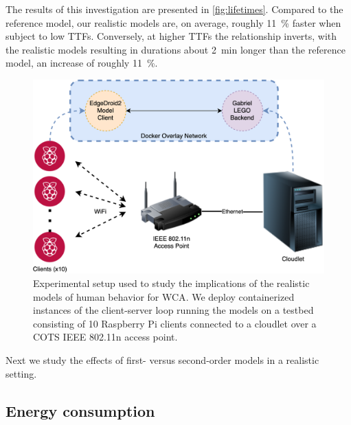 The results of this investigation are presented in \cref{fig:lifetimes}.
Compared to the reference model, our realistic models are, on average, roughly \SI{11}{\percent} faster when subject to low \acp{TTF}.
Conversely, at higher \acp{TTF} the relationship inverts, with the realistic models resulting in durations about \SI{2}{\minute} longer than the reference model, an increase of roughly \SI{11}{\percent}.


\begin{figure}
    \centering
    \includegraphics[width=\columnwidth]{figs/EdgeDroid2ExperimentalSetup.png}
    \caption{%
        Experimental setup used to study the implications of the realistic models of human behavior for \ac{WCA}.
        We deploy containerized instances of the client-server loop running the models on a testbed consisting of \num{10} Raspberry Pi clients connected to a cloudlet over a \ac{COTS} \acs{IEEE} \num{802.11}n access point.
    }\label{fig:expsetup}
\end{figure}

Next we study the effects of first- versus second-order models in a realistic setting.


\subsection{Energy consumption}

